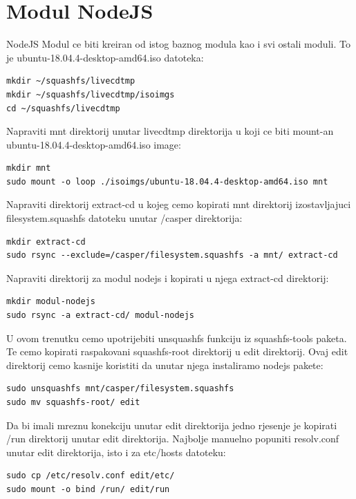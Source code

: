 \documentclass[12pt,vi]{mitthesis}
\begin{document}
\chapter*{Modul NodeJS}
NodeJS Modul ce biti kreiran od istog baznog modula kao i svi ostali moduli. To je ubuntu-18.04.4-desktop-amd64.iso datoteka:
\begin{lstlisting}[style=BashInputStyle]
mkdir ~/squashfs/livecdtmp
mkdir ~/squashfs/livecdtmp/isoimgs
cd ~/squashfs/livecdtmp
\end{lstlisting}

\noindent
Napraviti mnt direktorij unutar livecdtmp direktorija u koji ce biti mount-an ubuntu-18.04.4-desktop-amd64.iso image:
\begin{lstlisting}[style=BashInputStyle]
mkdir mnt
sudo mount -o loop ./isoimgs/ubuntu-18.04.4-desktop-amd64.iso mnt
\end{lstlisting}

\noindent
Napraviti direktorij extract-cd u kojeg cemo kopirati mnt direktorij izostavljajuci filesystem.squashfs datoteku unutar /casper direktorija:
\begin{lstlisting}[style=BashInputStyle]
mkdir extract-cd
sudo rsync --exclude=/casper/filesystem.squashfs -a mnt/ extract-cd
\end{lstlisting}

\noindent
Napraviti direktorij za modul nodejs i kopirati u njega extract-cd direktorij:
\begin{lstlisting}[style=BashInputStyle]
mkdir modul-nodejs
sudo rsync -a extract-cd/ modul-nodejs
\end{lstlisting}

\noindent
U ovom trenutku cemo upotrijebiti unsquashfs funkciju iz squashfs-tools paketa. Te cemo kopirati raspakovani squashfs-root direktorij u edit direktorij. Ovaj edit direktorij cemo kasnije koristiti da unutar njega instaliramo nodejs pakete:
\begin{lstlisting}[style=BashInputStyle]
sudo unsquashfs mnt/casper/filesystem.squashfs
sudo mv squashfs-root/ edit
\end{lstlisting}

\noindent
Da bi imali mreznu konekciju unutar edit direktorija jedno rjesenje je kopirati /run direktorij unutar edit direktorija.
Najbolje manuelno popuniti resolv.conf unutar edit direktorija, isto i za etc/hosts datoteku:
\begin{lstlisting}[style=BashInputStyle]
sudo cp /etc/resolv.conf edit/etc/
sudo mount -o bind /run/ edit/run
\end{lstlisting}
\end{document}
